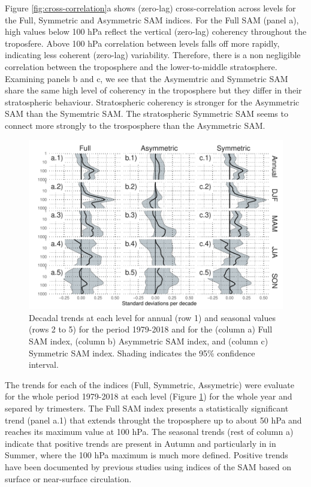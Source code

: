 \documentclass[]{ametsocV5}
\begin{document}
Figure \ref{fig:cross-correlation}a shows (zero-lag) cross-correlation
across levels for the Full, Symmetric and Asymmetric SAM indices. For
the Full SAM (panel a), high values below 100 hPa reflect the vertical
(zero-lag) coherency throughout the troposfere. Above 100 hPa
correlation between levels falls off more rapidly, indicating less
coherent (zero-lag) variability. Therefore, there is a non negligible
correlation between the troposphere and the lower-to-middle
stratosphere. Examining panels b and c, we see that the Asymemtric and
Symmetric SAM share the same high level of coherency in the troposphere
but they differ in their stratospheric behaviour. Stratospheric
coherency is stronger for the Asymmetric SAM than the Symemtric SAM. The
stratospheric Symmetric SAM seems to connect more strongly to the
trosposphere than the Asymmetric SAM.

\begin{figure}
\includegraphics{trends-1} \caption[Decadal trends at each level for annual (row 1) and seasonal values (rows 2 to 5) for the period 1979-2018 and for the (column a) Full SAM index, (column b) Asymmetric SAM index, and (column c) Symmetric SAM index]{Decadal trends at each level for annual (row 1) and seasonal values (rows 2 to 5) for the period 1979-2018 and for the (column a) Full SAM index, (column b) Asymmetric SAM index, and (column c) Symmetric SAM index. Shading indicates the 95\% confidence interval.}\label{fig:trends}
\end{figure}

The trends for each of the indices (Full, Symmetric, Assymetric) were
evaluate for the whole period 1979-2018 at each level (Figure
\ref{fig:trends}) for the whole year and separed by trimesters. The Full
SAM index presents a statistically significant trend (panel a.1) that
extends throught the troposphere up to about 50 hPa and reaches its
maximum value at 100 hPa. The seasonal trends (rest of column a)
indicate that positive trends are present in Autumn and particularly in
in Summer, where the 100 hPa maximum is much more defined. Positive
trends have been documented by previous studies \citep[e.g.][ and
references therein]{fogt2020} using indices of the SAM based on surface
or near-surface circulation.
\end{document}
